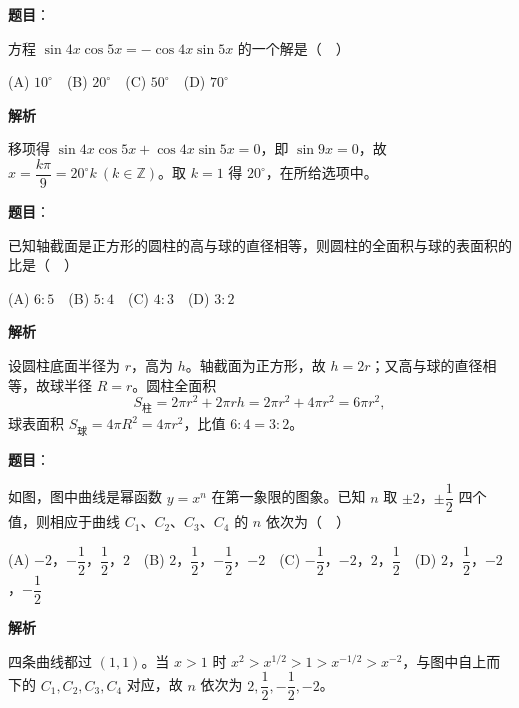 \begin{answer}

\textbf{题目}：

方程 \(\sin 4x\cos 5x=-\cos 4x\sin 5x\) 的一个解是（　）

(A) \(10^{\circ}\)　(B) \(20^{\circ}\)　(C) \(50^{\circ}\)　(D) \(70^{\circ}\)

\textbf{解析}

移项得 \(\sin4x\cos5x+\cos4x\sin5x=0\)，即 \(\sin9x=0\)，故 \(x=\dfrac{k\pi}{9}=20^\circ k\ (k\in\mathbb Z)\)。取 \(k=1\) 得 \(20^\circ\)，在所给选项中。


\end{answer}
\begin{answer}

\textbf{题目}：

已知轴截面是正方形的圆柱的高与球的直径相等，则圆柱的全面积与球的表面积的比是（　）

(A) \(6:5\)　(B) \(5:4\)　(C) \(4:3\)　(D) \(3:2\)

\textbf{解析}

设圆柱底面半径为 \(r\)，高为 \(h\)。轴截面为正方形，故 \(h=2r\)；又高与球的直径相等，故球半径 \(R=r\)。圆柱全面积
\nopagebreak[4]
\[
S_{\text{柱}}=2\pi r^2+2\pi rh=2\pi r^2+4\pi r^2=6\pi r^2,
\]
球表面积 \(S_{\text{球}}=4\pi R^2=4\pi r^2\)，比值 \(6:4=3:2\)。


\end{answer}
\begin{answer}

\textbf{题目}：

如图，图中曲线是幂函数 \(y=x^{n}\) 在第一象限的图象。已知 \(n\) 取 \(\pm 2\)，\(\pm\dfrac{1}{2}\) 四个值，则相应于曲线 \(C_1\)、\(C_2\)、\(C_3\)、\(C_4\) 的 \(n\) 依次为（　）
\nopagebreak[4]
\begin{center}\end{center}
\nopagebreak[4]
(A) \(-2\)，\(-\dfrac{1}{2}\)，\(\dfrac{1}{2}\)，\(2\)　(B) \(2\)，\(\dfrac{1}{2}\)，\(-\dfrac{1}{2}\)，\(-2\)　(C) \(-\dfrac{1}{2}\)，\(-2\)，\(2\)，\(\dfrac{1}{2}\)　(D) \(2\)，\(\dfrac{1}{2}\)，\(-2\)，\(-\dfrac{1}{2}\)

\textbf{解析}

四条曲线都过 \((1,1)\)。当 \(x>1\) 时 \(x^{2}>x^{1/2}>1>x^{-1/2}>x^{-2}\)，与图中自上而下的 \(C_1,C_2,C_3,C_4\) 对应，故 \(n\) 依次为 \(2,\dfrac12,-\dfrac12,-2\)。


\end{answer}
